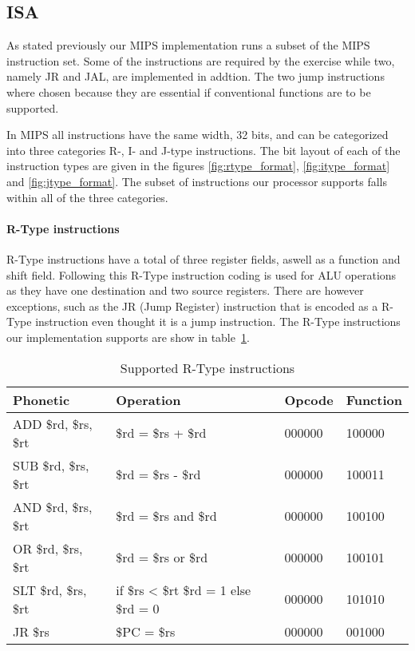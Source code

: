 \subsection{ISA}
\label{sec:isa}
As stated previously our MIPS implementation runs a subset of the MIPS instruction set. Some of the instructions are required by the exercise while two, namely JR and JAL, are implemented in addtion. The two jump instructions where chosen because they are essential if conventional functions are to be supported.

In MIPS all instructions have the same width, 32 bits, and can be categorized into three categories R-, I- and J-type instructions. The bit layout of each of the instruction types are given in the figures \ref{fig:rtype_format}, \ref{fig:itype_format} and \ref{fig:jtype_format}. The subset of instructions our processor supports falls within all of the three categories. 

\paragraph{R-Type instructions}

R-Type instructions have a total of three register fields, aswell as a function and shift field. Following this R-Type instruction coding is used for ALU operations as they have one destination and two source registers. There are however exceptions, such as the JR (Jump Register) instruction that is encoded as a R-Type instruction even thought it is a jump instruction. The R-Type instructions our implementation supports are show in table~\ref{table:rtype_instructions}.

\begin{table}[h]
    \begin{tabular}{l|l|l|l}
    Phonetic & Operation & Opcode & Function \\

    \hline
    ADD \$rd, \$rs, \$rt & \$rd = \$rs + \$rd   & 000000 & 100000 \\
    SUB \$rd, \$rs, \$rt & \$rd = \$rs - \$rd   & 000000 & 100011 \\ 
    AND \$rd, \$rs, \$rt & \$rd = \$rs and \$rd & 000000 & 100100 \\ 
    OR  \$rd, \$rs, \$rt & \$rd = \$rs or \$rd  & 000000 & 100101 \\  
    SLT \$rd, \$rs, \$rt & if \$rs < \$rt \$rd = 1 else \$rd = 0  & 000000 & 101010 \\ 
    JR  \$rs             & \$PC = \$rs          & 000000 & 001000 \\ 
    \hline
    \end{tabular}

    \caption{Supported R-Type instructions}
    \label{table:rtype_instructions}
\end{table}

